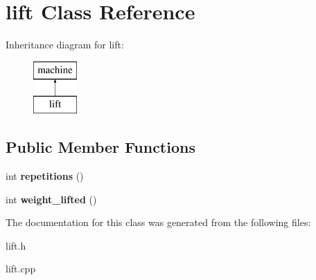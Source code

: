 \hypertarget{classlift}{\section{lift Class Reference}
\label{classlift}
}
Inheritance diagram for lift\-:\begin{figure}[H]
\begin{center}
\leavevmode
\includegraphics[height=2.000000cm]{classlift}
\end{center}
\end{figure}
\subsection*{Public Member Functions}
\begin{DoxyCompactItemize}
\item 
\hypertarget{classlift_a9f371f20603a92b21141ebc31503b0d7}{int {\bfseries repetitions} ()}\label{classlift_a9f371f20603a92b21141ebc31503b0d7}

\item 
\hypertarget{classlift_aaabecf780e0d0e1ed433fc92b301551f}{int {\bfseries weight\-\_\-lifted} ()}\label{classlift_aaabecf780e0d0e1ed433fc92b301551f}

\end{DoxyCompactItemize}


The documentation for this class was generated from the following files\-:\begin{DoxyCompactItemize}
\item 
lift.\-h\item 
lift.\-cpp\end{DoxyCompactItemize}
